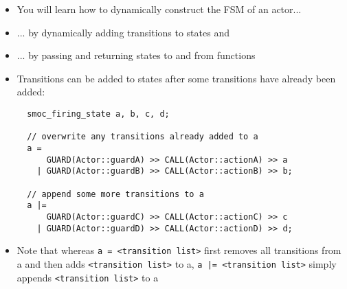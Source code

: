 \begin{frame}
\begin{itemize}
\item You will learn how to dynamically construct the FSM of an actor...
\item ... by dynamically adding transitions to states and
\item ... by passing and returning states to and from functions
\end{itemize}
\end{frame}


\begin{frame}[fragile=singleslide]
\begin{itemize}
\item Transitions can be added to states after some transitions have already been added:
\begin{lstlisting}
  smoc_firing_state a, b, c, d;
  
  // overwrite any transitions already added to a
  a =
      GUARD(Actor::guardA) >> CALL(Actor::actionA) >> a
    | GUARD(Actor::guardB) >> CALL(Actor::actionB) >> b;
  
  // append some more transitions to a
  a |= 
      GUARD(Actor::guardC) >> CALL(Actor::actionC) >> c
    | GUARD(Actor::guardD) >> CALL(Actor::actionD) >> d;  
\end{lstlisting}
\item Note that whereas \texttt{a = <transition list>} first removes all transitions from a and then
      adds \texttt{<transition list>} to a, \texttt{a |= <transition list>} simply appends \texttt{<transition list>}
      to a
\end{itemize}
\end{frame}

